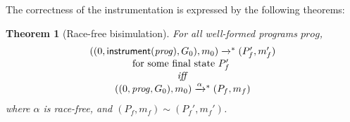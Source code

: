 \documentclass[preprint, 10pt]{sigplanconf}
\newcommand{\instrp}[1]{\ensuremath{\mathsf{instrument}(#1)}}
\newcommand{\cfg}[2]{\ensuremath{(#1, #2)}}
\newcommand{\anarrow}[2]{\ensuremath{\xrightarrow{#2}_{#1}}}
\newcommand{\exec}[5]{\ensuremath{\cfg{#1}{#2} \anarrow{#3}{#4} #5}}
\newcommand{\execstar}[4]{\ensuremath{\cfg{#1}{#2} \tto{#3} #4}}
\newcommand{\iexec}[4]{\ensuremath{\cfg{#1}{#2} \Rightarrow_{#3} #4}}
\newcommand{\tto}[1]{\mathrel{
  \vphantom{\xrightarrow{#1}}
  \smash{\xrightarrow{#1}}
  \vphantom{\to}^{*}}
}
\newtheorem{lemma}{Lemma}
\newtheorem{theorem}{Theorem}
\begin{document}


The correctness of the instrumentation is expressed by the following theorems:

\begin{theorem}[Race-free bisimulation]\label{safe} 
 For all  well-formed programs $\mathit{prog}$, 
\[
\begin{array}{c}
\execstar{(0, \instrp{\mathit{prog}}, G_0)}{m_0}{}{(P_f', m_f')}    
\\
\mbox{for some final state $P_f'$ }
\\
\mathit{iff} \\ 
\execstar{(0, \mathit{prog}, G_0)}{m_0}{\alpha}{(P_f, m_f)}
\end{array}
\]
where $\alpha$ is race-free, and $(P_f, m_f) \sim (P_f', m_f')$.
\end{theorem}
\end{document}
